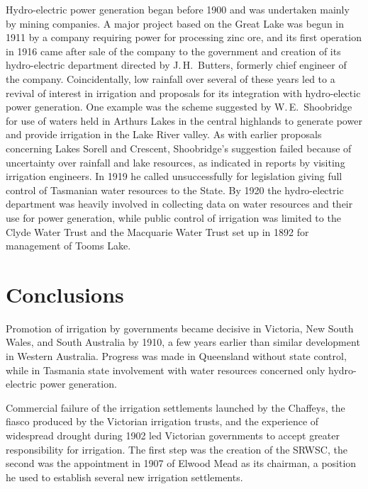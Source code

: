 Hydro-electric power generation began before 1900 and was undertaken
mainly by mining companies.  A major project based on the Great Lake
was begun in 1911 by a company requiring power for processing zinc
ore, and its first operation in 1916 came after sale of the company to
the government and creation of its hydro-electric department directed
by J.\,H.~Butters, formerly chief engineer of the company.
Coincidentally, low rainfall over several of these years led to a
revival of interest in irrigation and proposals for its integration
with hydro-electic power generation.  One example was the scheme
suggested by W.\,E.~Shoobridge for use of waters held in Arthurs Lakes
in the central highlands to generate power and provide irrigation in
the Lake River valley.  As with
earlier proposals concerning Lakes Sorell and Crescent, Shoobridge's
suggestion failed because of uncertainty over rainfall and lake
resources, as indicated in reports by visiting irrigation
engineers.  In 1919 he
called unsuccessfully for legislation giving full control of Tasmanian
water resources to the State.  By 1920 the hydro-electric department
was heavily involved in collecting data on water resources and their
use for power generation, while public control of irrigation was
limited to the Clyde Water Trust and the Macquarie Water Trust set up
in 1892 for management of Tooms Lake.

\section*{Conclusions}

Promotion of irrigation by governments became decisive in Victoria,
New South Wales, and South Australia by 1910, a few years earlier than
similar development in Western Australia.  Progress was made in
Queensland without state control, while in Tasmania state involvement
with water resources concerned only hydro-electric power generation.

Commercial failure of the irrigation settlements launched by the
Chaffeys, the fiasco produced by the Victorian irrigation trusts, and
the experience of widespread drought during 1902 led Victorian
governments to accept greater responsibility for irrigation.  The
first step was the creation of the SRWSC, the second was the
appointment in 1907 of Elwood Mead as its chairman, a position he used
to establish several new irrigation settlements.

